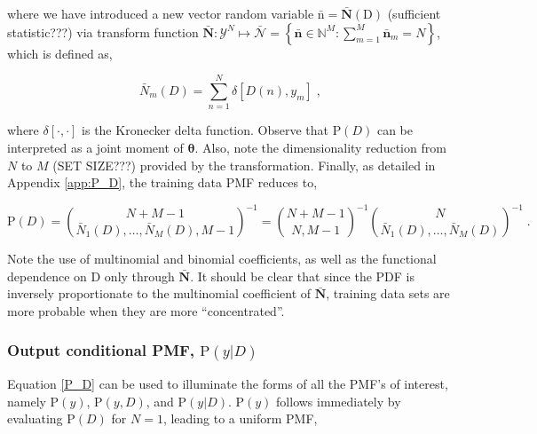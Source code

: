 \documentclass[12pt]{article}
\begin{document}
where we have introduced a new vector random variable $\bar{\bm{\mathrm{n}}} = \bar{\bm{N}}(\mathrm{D})$ (sufficient statistic???) via transform function $\bar{\bm{N}}: \mathcal{Y}^N \mapsto \bar{\mathcal{N}} = \left\{ \bar{\bm{n}} \in \mathbb{N}^M: \sum_{m=1}^M \bar{\bm{n}}_m = N \right\}$, which is defined as,


\begin{equation}
\bar{N}_m(D) = \sum_{n=1}^N \delta[D(n),y_m] \;,
\end{equation}

where $\delta[\cdot,\cdot]$ is the Kronecker delta function. Observe that $\text{P}(D)$ can be interpreted as a joint moment of $\bm{\theta}$. Also, note the dimensionality reduction from $N$ to $M$ (SET SIZE???) provided by the transformation. Finally, as detailed in Appendix \ref{app:P_D}, the training data PMF reduces to,

\begin{equation} \label{P_D}
\text{P}(D) = \binom{N+M-1}{\bar{N}_1(D),\ldots,\bar{N}_M(D),M-1}^{-1} 
= \binom{N+M-1}{N,M-1}^{-1} \binom{N}{\bar{N}_1(D),\ldots,\bar{N}_M(D)}^{-1} \;.
\end{equation}

Note the use of multinomial and binomial coefficients, as well as the functional dependence on $\mathrm{D}$ only through $\bar{\bm{N}}$. It should be clear that since the PDF is inversely proportionate to the multinomial coefficient of $\bar{\bm{N}}$, training data sets are more probable when they are more ``concentrated''. 





\subsubsection{Output conditional PMF, $\text{P}(y | D)$}

Equation \eqref{P_D} can be used to illuminate the forms of all the PMF's of interest, namely $\text{P}(y)$, $\text{P}(y,D)$, and $\text{P}(y | D)$.  $\text{P}(y)$ follows immediately by evaluating $\text{P}(D)$ for $N=1$, leading to a uniform PMF,
\end{document}
